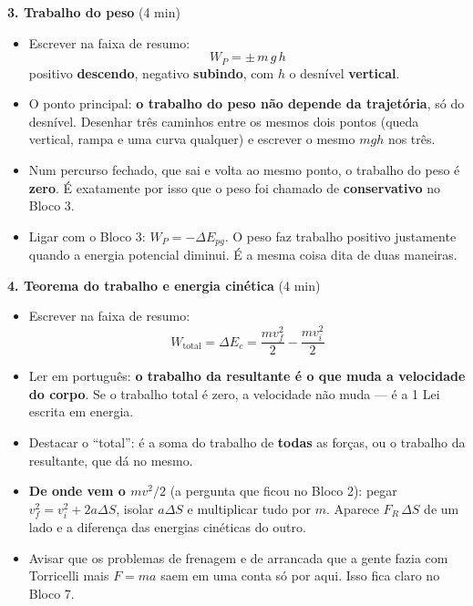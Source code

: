 \documentclass[11pt,a4paper]{article}
\begin{document}
\begin{quadro}
\medskip
\textbf{3. Trabalho do peso} (4 min)
\begin{itemize}[nosep]
  \item Escrever na faixa de resumo:
  \[
    W_P = \pm\, m\,g\,h
  \]
  positivo \textbf{descendo}, negativo \textbf{subindo}, com $h$ o
  desn\'ivel \textbf{vertical}.
  \item O ponto principal: \textbf{o trabalho do peso n\~ao depende da
        trajet\'oria}, s\'o do desn\'ivel. Desenhar tr\^es caminhos
        entre os mesmos dois pontos (queda vertical, rampa e uma curva
        qualquer) e escrever o mesmo $mgh$ nos tr\^es.
  \item Num percurso fechado, que sai e volta ao mesmo ponto, o
        trabalho do peso \'e \textbf{zero}. \'E exatamente por isso que
        o peso foi chamado de \textbf{conservativo} no Bloco 3.
  \item Ligar com o Bloco 3: $W_P = -\Delta E_{pg}$. O peso faz
        trabalho positivo justamente quando a energia potencial
        diminui. \'E a mesma coisa dita de duas maneiras.
\end{itemize}

\medskip
\textbf{4. Teorema do trabalho e energia cin\'etica} (4 min)
\begin{itemize}[nosep]
  \item Escrever na faixa de resumo:
  \[
    \boxed{W_{\text{total}} = \Delta E_c = \frac{m v_f^2}{2}
      - \frac{m v_i^2}{2}}
  \]
  \item Ler em portugu\^es: \textbf{o trabalho da resultante \'e o que
        muda a velocidade do corpo}. Se o trabalho total \'e zero, a
        velocidade n\~ao muda --- \'e a 1\textordfeminine{} Lei escrita
        em energia.
  \item Destacar o ``total'': \'e a soma do trabalho de
        \textbf{todas} as for\c{c}as, ou o trabalho da resultante, que
        d\'a no mesmo.
  \item \textbf{De onde vem o $mv^2/2$} (a pergunta que ficou no Bloco
        2): pegar $v_f^2 = v_i^2 + 2a\Delta S$, isolar $a\Delta S$ e
        multiplicar tudo por $m$. Aparece $F_R\,\Delta S$ de um lado e
        a diferen\c{c}a das energias cin\'eticas do outro.
  \item Avisar que os problemas de frenagem e de arrancada que a gente
        fazia com Torricelli mais $F = ma$ saem em uma conta s\'o por
        aqui. Isso fica claro no Bloco 7.
\end{itemize}


\end{quadro}
\end{document}
